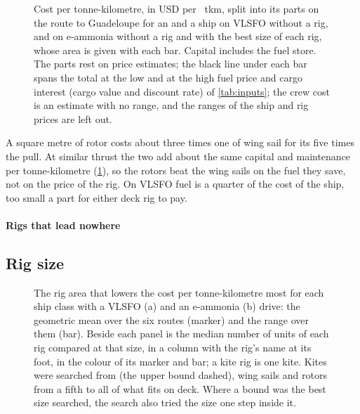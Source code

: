 \begin{figure}[tbp]
\centering
{}
\caption{Cost per tonne-kilometre, in USD per ~tkm, split into its parts on the route to Guadeloupe for an  and a  ship on VLSFO without a rig, and on e-ammonia without a rig and with the best size of each rig, whose area is given with each bar. Capital includes the fuel store. The parts rest on price estimates; the black line under each bar spans the total at the low and at the high fuel price and cargo interest (cargo value and discount rate) of \cref{tab:inputs}; the crew cost is an estimate with no range, and the ranges of the ship and rig prices are left out.}
\label{fig:breakdown}
\end{figure}

A square metre of rotor costs about three times one of wing sail for its five times the pull. At similar thrust the two add about the same capital and maintenance per tonne-kilometre (\cref{fig:breakdown}), so the rotors beat the wing sails on the fuel they save, not on the price of the rig. On VLSFO fuel is a quarter of the cost of the  ship, too small a part for either deck rig to pay.

\paragraph{Rigs that lead nowhere}\label{sec:res_trailing} \NumTrailing{}

\subsection{Rig size}
\label{sec:res_size}
\label{app:abatement}

\begin{figure}[tbp]
\centering
{}
\caption{The rig area that lowers the cost per tonne-kilometre most for each ship class with a VLSFO (a) and an e-ammonia (b) drive: the geometric mean over the six routes (marker) and the range over them (bar). Beside each panel is the median number of units of each rig compared at that size, in a column with the rig's name at its foot, in the colour of its marker and bar; a kite rig is one kite. Kites were searched from  (the upper bound dashed), wing sails and rotors from a fifth to all of what fits on deck. Where a bound was the best size searched, the search also tried the size one step inside it.}
\label{fig:class_sizes}
\end{figure}

